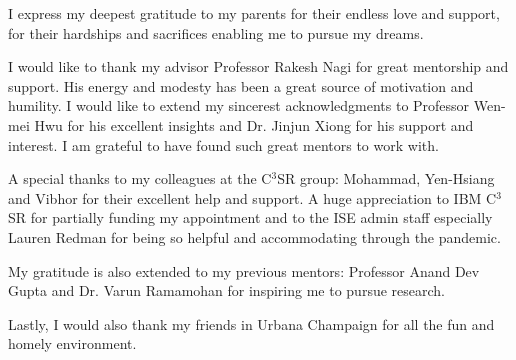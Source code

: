 I express my deepest gratitude to my parents for their endless love and support, for their hardships and sacrifices enabling me to pursue my dreams.

I would like to thank my advisor Professor Rakesh Nagi for great mentorship and support. His energy and modesty has been a great source of motivation and humility.
I would like to extend my sincerest acknowledgments to Professor Wen-mei Hwu for his excellent insights and Dr. Jinjun Xiong for his support and interest. 
I am grateful to have found such great mentors to work with.

A special thanks to my colleagues at the C$^3$SR group: Mohammad, Yen-Hsiang and Vibhor for their excellent help and support. A huge appreciation to IBM C$^3$SR for partially funding my appointment and to the ISE admin staff especially Lauren Redman for being so helpful and accommodating through the pandemic.

My gratitude is also extended to my previous mentors: Professor Anand Dev Gupta and Dr. Varun Ramamohan for inspiring me to pursue research.

Lastly, I would also thank my friends in Urbana Champaign for all the fun and homely environment.